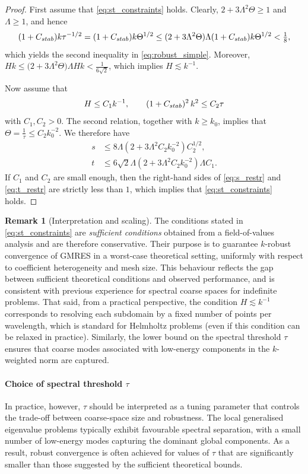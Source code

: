 \documentclass[preprint,3p,times]{elsarticle}
\newcommand{\Cstab}{C_{\textup{\textsf{stab}}}}
\theoremstyle{definition}
\newtheorem{remark}[theorem]{Remark}
\numberwithin{equation}{section}
\begin{document}
\begin{proof}
First assume that \eqref{eq:st_constraints} holds.
Clearly, $2+3\Lambda^2\Theta\ge 1$ and $\Lambda\ge1$, and hence
\[
	(1+\Cstab)k\tau^{-1/2} = (1+\Cstab)k\Theta^{1/2}
	\le (2+3\Lambda^2\Theta)\Lambda(1+\Cstab)k\Theta^{1/2} < \tfrac{1}{8},
\]
which yields the second inequality in \eqref{eq:robust_simple}.
Moreover, $Hk \le \bigl(2+3\Lambda^2\Theta\bigr)\Lambda H k< \frac{1}{6\sqrt{2}}$, which implies $H\lesssim k^{-1}$.


Now assume that
\[
	H \le C_1k^{-1}, \qquad (1+\Cstab)^2\,k^2 \le C_2\tau
\]
with $C_1,C_2>0$.
The second relation, together with $k\ge k_0$, implies that $\Theta=\frac{1}{\tau}\le C_2k_0^{-2}$.
We therefore have
\begin{align}
	\label{eq:s_restr}
	s &\le 8\Lambda(2+3\Lambda^2C_2k_0^{-2}) C_2^{1/2},
	\\[1ex]
	\label{eq:t_restr}
	t &\le 6\sqrt{2}\Lambda(2+3\Lambda^2C_2k_0^{-2})\Lambda C_1.
\end{align}
If $C_1$ and $C_2$ are small enough, then the right-hand sides of \eqref{eq:s_restr} and \eqref{eq:t_restr}
are strictly less than $1$, which implies that \eqref{eq:st_constraints} holds.
\end{proof}

{\begin{remark}[Interpretation and scaling]
\label{rem:interpretation}
The conditions stated in \eqref{eq:st_constraints} are \textit{sufficient conditions} obtained from a field-of-values analysis and are therefore conservative. 
Their purpose is to guarantee $k$-robust convergence of GMRES in a worst-case theoretical setting, uniformly with respect to coefficient heterogeneity and mesh size. This behaviour reflects the gap between sufficient theoretical conditions and observed performance, and is consistent with previous experience for spectral coarse spaces for indefinite problems. That said, from a practical perspective, the condition $H \lesssim k^{-1}$ corresponds to resolving each subdomain by a fixed number of points per wavelength, which is standard for Helmholtz problems (even if this condition can be relaxed in practice). 
Similarly, the lower bound on the spectral threshold $\tau$ ensures that coarse modes associated with low-energy components in the $k$-weighted norm are captured. 
\end{remark}
\paragraph{Choice of spectral threshold $\tau$}
In practice, however, $\tau$ should be interpreted as a tuning parameter that controls the trade-off between coarse-space size and robustness. 
The local generalised eigenvalue problems typically exhibit favourable spectral separation, with a small number of low-energy modes capturing the dominant global components. 
As a result, robust convergence is often achieved for values of $\tau$ that are significantly smaller than those suggested by the sufficient theoretical bounds.
}
\end{document}
